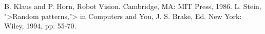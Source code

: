 %
%

\begin{thebibliography}{99}


 B. Klaus and P. Horn, Robot Vision. Cambridge, MA: MIT Press, 1986.
 L. Stein, ">Random patterns,"> in Computers and You, J. S. Brake, Ed. New York: Wiley, 1994, pp. 55-70.



\end{thebibliography}

